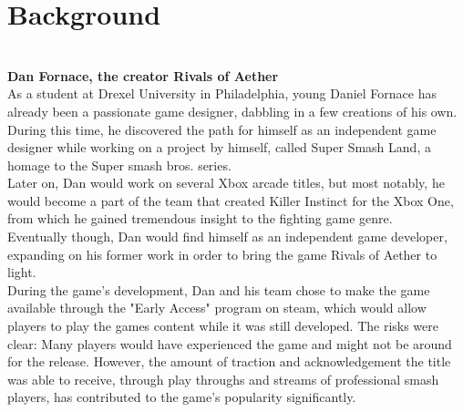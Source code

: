 \documentclass{article}
\begin{document}
\chapter{\textbf{Background}}\\
\textbf{Dan Fornace, the creator Rivals of Aether}\cite{thirdkoopa2016:10}\\%
As a student at Drexel University in Philadelphia, young Daniel Fornace has already been a passionate game designer, dabbling in a few creations of his own. During this time, he discovered the path for himself as an independent game designer while working on a project by himself, called Super Smash Land, a homage to the Super smash bros. series.\\
Later on, Dan would work on several Xbox arcade titles, but most notably, he would become a part of the team that created Killer Instinct for the Xbox One, from which he gained tremendous insight to the fighting game genre.\\
Eventually though, Dan would find himself as an independent game developer, expanding on his former work in order to bring the game Rivals of Aether to light.\\

During the game's development, Dan and his team chose to make the game available through the "Early Access" program on steam, which would allow players to play the games content while it was still developed. The risks were clear: Many players would have experienced the game and might not be around for the release. However, the amount of traction and acknowledgement the title was able to receive, through play throughs and streams of professional smash players, has contributed to the game's popularity significantly.\\

\end{document}
